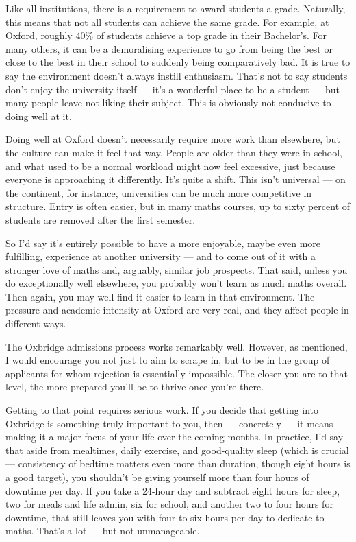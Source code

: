 \documentclass[11pt]{article}
\newif\ifshowcomments
\newcommand{\comment}[1]{\ifshowcomments\textcolor{myblue}{\textbf{#1}}\fi}
\begin{document}
Like all institutions, there is a requirement to award students a grade. Naturally, this means that not all students can achieve the same grade. For example, at Oxford, roughly 40\% of students achieve a top grade in their Bachelor's. For many others, it can be a demoralising experience to go from being the best or close to the best in their school to suddenly being comparatively bad. It is true to say the environment doesn’t always instill enthusiasm. That’s not to say students don’t enjoy the university itself — it’s a wonderful place to be a student — but many people leave not liking their subject. This is obviously not conducive to doing well at it.

Doing well at Oxford doesn’t necessarily require more work than elsewhere, but the culture can make it feel that way. People are older than they were in school, and what used to be a normal workload might now feel excessive, just because everyone is approaching it differently. It’s quite a shift. This isn’t universal --- on the continent, for instance, universities can be much more competitive in structure. Entry is often easier, but in many maths courses, up to sixty percent of students are removed after the first semester.

So I’d say it’s entirely possible to have a more enjoyable, maybe even more fulfilling, experience at another university --- and to come out of it with a stronger love of maths and, arguably, similar job prospects. That said, unless you do exceptionally well elsewhere, you probably won’t learn as much maths overall. Then again, you may well find it easier to learn in that environment. The pressure and academic intensity at Oxford are very real, and they affect people in different ways.

\comment{From what I've seen of you, Aarna, you have the curiosity and ability that Oxbridge looks for, and are clearly advanced past your years. You should definitely go to Oxbridge. There are some things to be said about starting study at Oxford when you are a younger age, such as yourself. I can chat to you about what I know other students have experienced in this regard, if you want!}

The Oxbridge admissions process works remarkably well. However, as mentioned, I would encourage you not just to aim to scrape in, but to be in the group of applicants for whom rejection is essentially impossible. The closer you are to that level, the more prepared you’ll be to thrive once you’re there.

Getting to that point requires serious work. If you decide that getting into Oxbridge is something truly important to you, then --- concretely --- it means making it a major focus of your life over the coming months. In practice, I’d say that aside from mealtimes, daily exercise, and good-quality sleep (which is crucial --- consistency of bedtime matters even more than duration, though eight hours is a good target), you shouldn’t be giving yourself more than four hours of downtime per day. If you take a 24-hour day and subtract eight hours for sleep, two for meals and life admin, six for school, and another two to four hours for downtime, that still leaves you with four to six hours per day to dedicate to maths. That’s a lot --- but not unmanageable.
\end{document}
